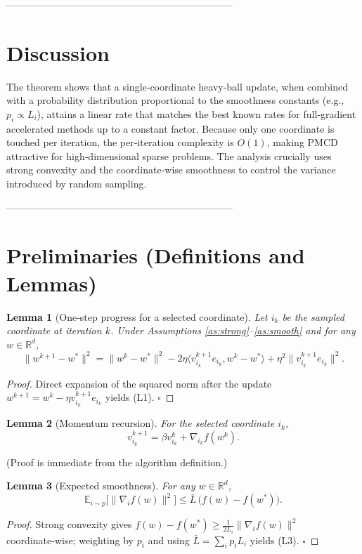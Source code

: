 \documentclass{article}
\newtheorem{lemma}{Lemma}
\newcommand{\E}{\mathbb{E}}
\newcommand{\R}{\mathbb{R}}
\begin{document}
---------------------------------------------------------------------

\section*{Discussion}
The theorem shows that a single‑coordinate heavy‑ball update, when combined
with a probability distribution proportional to the smoothness constants
(e.g., $p_i\propto L_i$), attains a linear rate that matches the best known
rates for full‑gradient accelerated methods up to a constant factor.
Because only one coordinate is touched per iteration, the per‑iteration
complexity is $O(1)$, making PMCD attractive for high‑dimensional sparse
problems. The analysis crucially uses strong convexity and the
coordinate‑wise smoothness to control the variance introduced by random
sampling.

---------------------------------------------------------------------

\section*{Preliminaries (Definitions and Lemmas)}
\begin{lemma}[One‑step progress for a selected coordinate]\label{lem:one}
Let $i_k$ be the sampled coordinate at iteration $k$. Under
Assumptions \ref{as:strong}–\ref{as:smooth} and for any $w\in\R^{d}$,
\[
\|w^{k+1}-w^{*}\|^{2}
= \|w^{k}-w^{*}\|^{2}
-2\eta\langle v_{i_k}^{k+1}e_{i_k},w^{k}-w^{*}\rangle
+\eta^{2}\|v_{i_k}^{k+1}e_{i_k}\|^{2}.
\tag{L1}
\]
\end{lemma}
\begin{proof}
Direct expansion of the squared norm after the update
$w^{k+1}=w^{k}-\eta v_{i_k}^{k+1}e_{i_k}$ yields (L1). $\square$
\end{proof}

\begin{lemma}[Momentum recursion]\label{lem:momentum}
For the selected coordinate $i_k$,
\[
v_{i_k}^{k+1}= \beta v_{i_k}^{k}+ \nabla_{i_k} f(w^{k}).
\tag{L2}
\]
\end{lemma}
(Proof is immediate from the algorithm definition.)

\begin{lemma}[Expected smoothness]\label{lem:exp-smooth}
For any $w\in\R^{d}$,
\[
\E_{i\sim p}\!\bigl[\|\nabla_i f(w)\|^{2}\bigr]\le \bar L\,\bigl(f(w)-f(w^{*})\bigr).
\tag{L3}
\]
\end{lemma}
\begin{proof}
Strong convexity gives $f(w)-f(w^{*})\ge \frac{1}{2L_i}\|\nabla_i f(w)\|^{2}$
coordinate‑wise; weighting by $p_i$ and using $\bar L=\sum_i p_i L_i$ yields (L3). $\square$
\end{proof}
\end{document}

